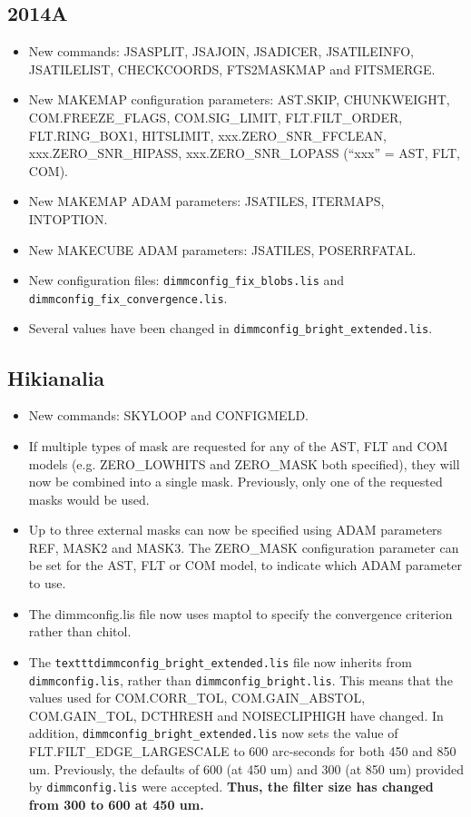 \documentclass[oneside,11pt]{starlink}
\begin{document}
\subsection{2014A}
\begin{itemize}
\item New commands: JSASPLIT, JSAJOIN, JSADICER, JSATILEINFO,
JSATILELIST, CHECKCOORDS, FTS2MASKMAP and FITSMERGE.
\item New MAKEMAP configuration parameters: AST.SKIP, CHUNKWEIGHT,
COM.FREEZE\_FLAGS, COM.SIG\_LIMIT, FLT.FILT\_ORDER, FLT.RING\_BOX1, HITSLIMIT,
xxx.ZERO\_SNR\_FFCLEAN, xxx.ZERO\_SNR\_HIPASS, xxx.ZERO\_SNR\_LOPASS (``xxx'' =
AST, FLT, COM).
\item New MAKEMAP ADAM parameters: JSATILES, ITERMAPS, INTOPTION.
\item New MAKECUBE ADAM parameters: JSATILES, POSERRFATAL.
\item New configuration files: \texttt{dimmconfig\_fix\_blobs.lis} and
\texttt{dimmconfig\_fix\_convergence.lis}.
\item Several values have been changed in \texttt{dimmconfig\_bright\_extended.lis}.
\end{itemize}

\subsection{Hikianalia}
\begin{itemize}
\item New commands: SKYLOOP and CONFIGMELD.
\item If multiple types of mask are requested for any of the AST, FLT
and COM models (e.g. ZERO\_LOWHITS and ZERO\_MASK both specified),
they will now be combined into a single mask. Previously, only one
of the requested masks would be used.
\item Up to three external masks can now be specified using ADAM parameters
REF, MASK2 and MASK3. The ZERO\_MASK configuration parameter can be set
for the AST, FLT or COM model, to indicate which ADAM parameter to use.
\item The dimmconfig.lis file now uses maptol to specify the convergence
criterion rather than chitol.
\item The \texttt{textttdimmconfig\_bright\_extended.lis} file now inherits from
\texttt{dimmconfig.lis}, rather than \texttt{dimmconfig\_bright.lis}. This means
that the values used for COM.CORR\_TOL, COM.GAIN\_ABSTOL, COM.GAIN\_TOL, DCTHRESH and
NOISECLIPHIGH have changed. In addition, \texttt{dimmconfig\_bright\_extended.lis}
now sets the value of FLT.FILT\_EDGE\_LARGESCALE to 600 arc-seconds for
both 450 and 850 um. Previously, the defaults of 600 (at 450 um) and 300
(at 850 um) provided by \texttt{dimmconfig.lis} were accepted. {\bf Thus, the filter
size has changed from 300 to 600 at 450 um.}
\end{itemize}
\end{document}
